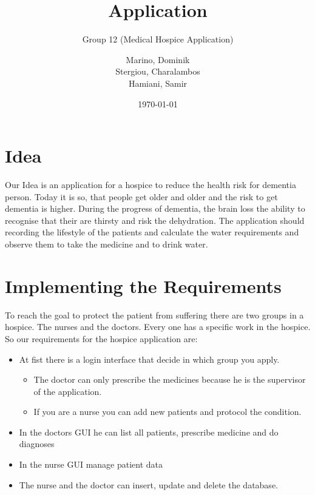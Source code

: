 \documentclass{scrartcl}
\begin{document}
\subject{Proposal of OOP-Project SS17---Biemann}
\title{Application}
\subtitle{Group 12 (Medical Hospice Application)}
\author{Marino, Dominik\\Stergiou, Charalambos\\ Hamiani, Samir}%
\date{\today}
\maketitle


\section{Idea}
Our Idea is an application for a hospice to reduce the health risk for dementia person. Today it is so, that people get older and older and the risk to get dementia is higher. During the progress of dementia, the brain loss the ability to recognise that their are thirsty and risk the dehydration. The application should recording the lifestyle of the patients and calculate the water requirements and observe them to take the medicine and to drink water. 

\section{Implementing the Requirements}
To reach the goal to protect the patient from suffering there are two groups in a hospice. The nurses and the doctors. Every one has a specific work in the hospice. So our requirements for the hospice application are:
\begin{itemize}
    \item At fist there is a login interface that decide in which group you apply. 
       \begin{itemize}
     \item The doctor can only prescribe the medicines because he is the supervisor of the application.
     \item If you are a nurse you can add new patients and protocol the condition.
   \end{itemize}
   \item In the doctors GUI he can list all patients, prescribe medicine and do diagnoses
        \item In the nurse GUI manage patient data
    \item The nurse and the doctor can insert, update and delete the database.
\end{itemize}
\end{document}
